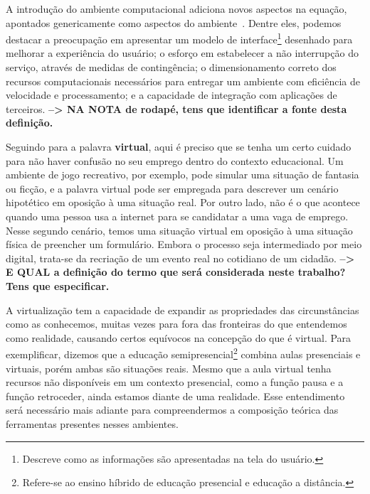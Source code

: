 A introdução do ambiente computacional adiciona novos aspectos na equação, apontados genericamente como aspectos do ambiente~\cite{Ferreira2016}. Dentre eles, podemos destacar a preocupação em apresentar um modelo de interface\footnote{Descreve como as informações são apresentadas na tela do usuário.} desenhado para melhorar a experiência do usuário; o esforço em estabelecer a não interrupção do serviço, através de medidas de contingência; o dimensionamento correto dos recursos computacionais necessários para entregar um ambiente com eficiência de velocidade e processamento; e a capacidade de integração com aplicações de terceiros. \textbf{--> NA NOTA de rodapé, tens que identificar a fonte desta definição.}

Seguindo para a palavra \textbf{virtual}, aqui é preciso que se tenha um certo cuidado para não haver confusão no seu emprego dentro do contexto educacional. Um ambiente de jogo recreativo, por exemplo, pode simular uma situação de fantasia ou ficção, e a palavra virtual pode ser empregada para descrever um cenário hipotético em oposição à uma situação real. Por outro lado, não é o que acontece quando uma pessoa usa a internet para se candidatar a uma vaga de emprego. Nesse segundo cenário, temos uma situação virtual em oposição à uma situação física de preencher um formulário. Embora o processo seja intermediado por meio digital, trata-se da recriação de um evento real no cotidiano de um cidadão. \textbf{--> E QUAL a definição do termo que será considerada neste trabalho? Tens que especificar.}

A virtualização tem a capacidade de expandir as propriedades das circunstâncias como as conhecemos, muitas vezes para fora das fronteiras do que entendemos como realidade, causando certos equívocos na concepção do que é virtual. Para exemplificar, dizemos que a educação semipresencial\footnote{Refere-se ao ensino híbrido de educação presencial e educação a distância.} combina aulas presenciais e virtuais, porém ambas são situações reais. Mesmo que a aula virtual tenha recursos não disponíveis em um contexto presencial, como a função pausa e a função retroceder, ainda estamos diante de uma realidade. Esse entendimento será necessário mais adiante para compreendermos a composição teórica das ferramentas presentes nesses ambientes.

